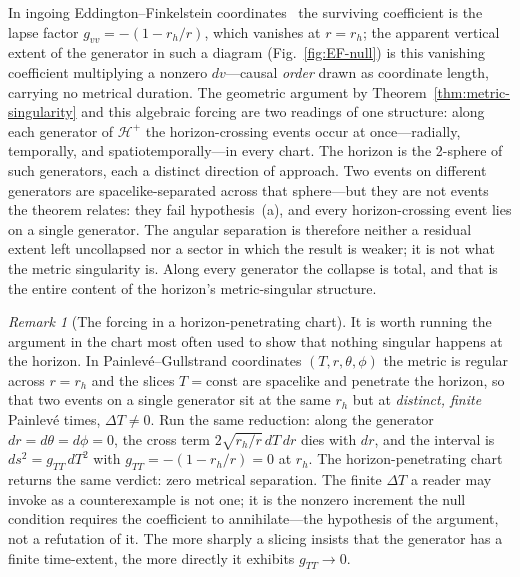 \documentclass[11pt,a4paper]{article}
\theoremstyle{plain}
\theoremstyle{remark}
\newtheorem{remark}{Remark}
\begin{document}
In ingoing Eddington--Finkelstein coordinates~\cite{Finkelstein1958,MTW1973} the surviving coefficient is the lapse factor $g_{vv}=-(1-r_h/r)$, which vanishes at $r=r_h$; the apparent vertical extent of the generator in such a diagram (Fig.~\ref{fig:EF-null}) is this vanishing coefficient multiplying a nonzero $dv$---causal \emph{order} drawn as coordinate length, carrying no metrical duration. The geometric argument by Theorem~\ref{thm:metric-singularity} and this algebraic forcing are two readings of one structure: along each generator of $\mathcal{H}^+$ the horizon-crossing events occur at once---radially, temporally, and spatiotemporally---in every chart. The horizon is the 2-sphere of such generators, each a distinct direction of approach. Two events on different generators are spacelike-separated across that sphere---but they are not events the theorem relates: they fail hypothesis~(a), and every horizon-crossing event lies on a single generator. The angular separation is therefore neither a residual extent left uncollapsed nor a sector in which the result is weaker; it is not what the metric singularity is. Along every generator the collapse is total, and that is the entire content of the horizon's metric-singular structure.

\begin{remark}[The forcing in a horizon-penetrating chart]\label{rem:PG-forcing}
It is worth running the argument in the chart most often used to show that nothing singular happens at the horizon. In Painlev\'e--Gullstrand coordinates $(T,r,\theta,\phi)$ the metric is regular across $r=r_h$ and the slices $T=\mathrm{const}$ are spacelike and penetrate the horizon, so that two events on a single generator sit at the same $r_h$ but at \emph{distinct, finite} Painlev\'e times, $\Delta T\neq0$. Run the same reduction: along the generator $dr=d\theta=d\phi=0$, the cross term $2\sqrt{r_h/r}\,dT\,dr$ dies with $dr$, and the interval is $ds^2=g_{TT}\,dT^2$ with $g_{TT}=-(1-r_h/r)=0$ at $r_h$. The horizon-penetrating chart returns the same verdict: zero metrical separation. The finite $\Delta T$ a reader may invoke as a counterexample is not one; it is the nonzero increment the null condition requires the coefficient to annihilate---the hypothesis of the argument, not a refutation of it. The more sharply a slicing insists that the generator has a finite time-extent, the more directly it exhibits $g_{TT}\to0$.
\end{remark}
\end{document}
